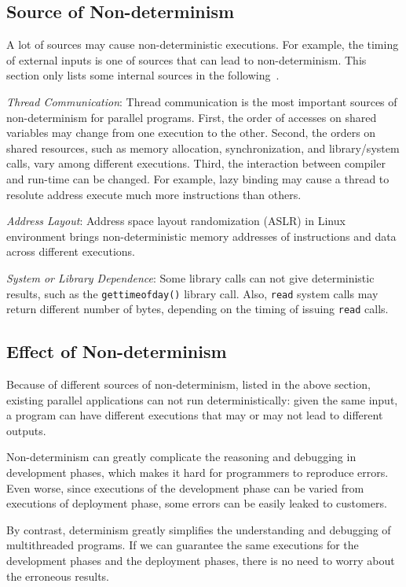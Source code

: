 \subsection{Source of Non-determinism}
A lot of sources may cause non-deterministic executions. 
For example, the timing of external inputs is one of sources that can lead to non-determinism. This section only lists some internal sources in the following~\cite{costofdeterminism}. 
 
\emph{Thread Communication}: 
Thread communication is the most important sources of non-determinism for parallel programs. 
First, the order of accesses on shared variables may change from one execution to the other. Second, the orders on shared resources, such as memory allocation, synchronization, and library/system calls, vary among different executions. 
Third, the interaction between compiler and run-time can be changed. For example, lazy binding may cause a thread to resolute address execute much more instructions than others. 

\emph{Address Layout}: 
Address space layout randomization (ASLR) in Linux environment brings non-deterministic memory addresses of instructions and data across different executions. 

\emph{System or Library Dependence}:
Some library calls can not give deterministic results, such as the \texttt{gettimeofday()} library call. Also, \texttt{read} system calls may return different number of bytes, depending on the timing of issuing \texttt{read} calls. 


\subsection{Effect of Non-determinism}
Because of different sources of non-determinism, listed in the above section, existing parallel applications can not run deterministically: given the same input, a program can have different executions that may or may not lead to different outputs. 

Non-determinism can greatly complicate the reasoning and debugging in development phases, which makes it hard for programmers to reproduce errors. 
Even worse, since executions of the development phase can be varied from executions of deployment phase, some errors can be easily leaked to customers.

By contrast, determinism greatly simplifies the understanding and debugging of multithreaded programs. If we can guarantee the same executions for the development phases and the deployment phases, there is no need to worry about the erroneous results. 

